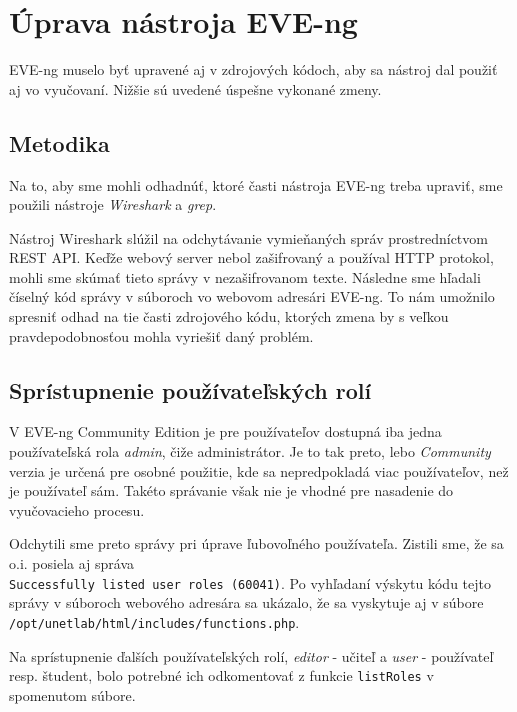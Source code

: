 \section{Úprava nástroja EVE-ng}
\label{chap:eve_ng_uprava_zdroj_kodov}

EVE-ng muselo byť upravené aj v zdrojových kódoch, aby sa nástroj dal použiť aj vo vyučovaní. Nižšie sú uvedené úspešne vykonané zmeny.




\subsection{Metodika}

Na to, aby sme mohli odhadnúť, ktoré časti nástroja EVE-ng treba upraviť, sme použili nástroje \emph{Wireshark} a \emph{grep}.

Nástroj Wireshark slúžil na odchytávanie vymieňaných správ prostredníctvom REST API. Keďže webový server nebol zašifrovaný a používal HTTP protokol, mohli sme skúmať tieto správy v nezašifrovanom texte. Následne sme hľadali číselný kód správy v súboroch vo webovom adresári EVE-ng. To nám umožnilo spresniť odhad na tie časti zdrojového kódu, ktorých zmena by s veľkou pravdepodobnosťou mohla vyriešiť daný problém.




\subsection{Sprístupnenie používateľských rolí}
\label{chap:eve_ng_pouzivatelske_role}

V EVE-ng Community Edition je pre používateľov dostupná iba jedna používateľská rola \mbox{\emph{admin}}, čiže administrátor. Je to tak preto, lebo \emph{Community} verzia je určená pre osobné použitie, kde sa nepredpokladá viac používateľov, než je používateľ sám. Takéto správanie však nie je vhodné pre nasadenie do vyučovacieho procesu.

Odchytili sme preto správy pri úprave ľubovoľného používateľa. Zistili sme, že sa o.i. posiela aj správa \\
\texttt{Successfully listed user roles (60041)}. Po vyhľadaní výskytu kódu tejto správy v súboroch webového adresára sa ukázalo, že sa vyskytuje aj v súbore \\
\texttt{/opt/unetlab/html/includes/functions.php}.

Na sprístupnenie ďalších používateľských rolí, \emph{editor} - učiteľ a \emph{user} - používateľ resp. študent, bolo potrebné ich odkomentovať z funkcie \texttt{listRoles} v spomenutom súbore.

